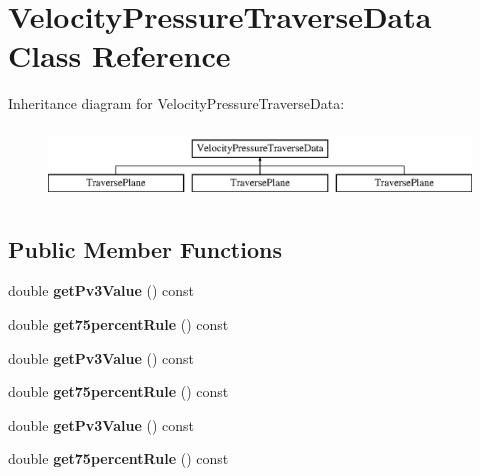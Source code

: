 \hypertarget{class_velocity_pressure_traverse_data}{}\section{Velocity\+Pressure\+Traverse\+Data Class Reference}
\label{class_velocity_pressure_traverse_data}
Inheritance diagram for Velocity\+Pressure\+Traverse\+Data\+:\begin{figure}[H]
\begin{center}
\leavevmode
\includegraphics[height=1.924399cm]{d8/d09/class_velocity_pressure_traverse_data}
\end{center}
\end{figure}
\subsection*{Public Member Functions}
\begin{DoxyCompactItemize}
\item 
\mbox{\label{class_velocity_pressure_traverse_data_ad40651783106845a732537b60877c70f}} 
double {\bfseries get\+Pv3\+Value} () const
\item 
\mbox{\label{class_velocity_pressure_traverse_data_aabde4db04d805c4264d3fc2036ef38a8}} 
double {\bfseries get75percent\+Rule} () const
\item 
\mbox{\label{class_velocity_pressure_traverse_data_ad40651783106845a732537b60877c70f}} 
double {\bfseries get\+Pv3\+Value} () const
\item 
\mbox{\label{class_velocity_pressure_traverse_data_aabde4db04d805c4264d3fc2036ef38a8}} 
double {\bfseries get75percent\+Rule} () const
\item 
\mbox{\label{class_velocity_pressure_traverse_data_ad40651783106845a732537b60877c70f}} 
double {\bfseries get\+Pv3\+Value} () const
\item 
\mbox{\label{class_velocity_pressure_traverse_data_aabde4db04d805c4264d3fc2036ef38a8}} 
double {\bfseries get75percent\+Rule} () const
\end{DoxyCompactItemize}
